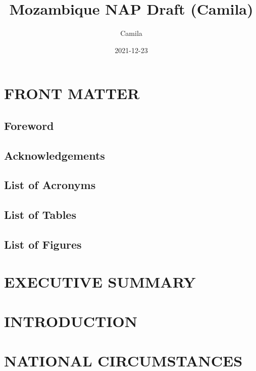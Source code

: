 \documentclass[
]{book}
\title{Mozambique NAP Draft (Camila)}
\author{Camila}
\date{2021-12-23}
\begin{document}
\maketitle

{
\setcounter{tocdepth}{1}
\tableofcontents
}
\hypertarget{front-matter}{%
\chapter{FRONT MATTER}\label{front-matter}}

\hypertarget{foreword}{%
\section{Foreword}\label{foreword}}

\hypertarget{acknowledgements}{%
\section{Acknowledgements}\label{acknowledgements}}

\hypertarget{list-of-acronyms}{%
\section{List of Acronyms}\label{list-of-acronyms}}

\hypertarget{list-of-tables}{%
\section{List of Tables}\label{list-of-tables}}

\hypertarget{list-of-figures}{%
\section{List of Figures}\label{list-of-figures}}

\hypertarget{executive-summary}{%
\chapter{EXECUTIVE SUMMARY}\label{executive-summary}}

\hypertarget{introduction}{%
\chapter{INTRODUCTION}\label{introduction}}

\hypertarget{national-circumstances}{%
\chapter{NATIONAL CIRCUMSTANCES}\label{national-circumstances}}
\end{document}
